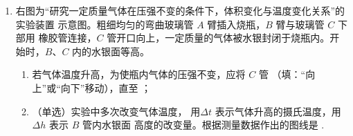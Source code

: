 \begin{enumerate}
\item 
{}
右图为“研究一定质量气体在压强不变的条件下，体积变化与温度变化关系”的实验装置
示意图。粗细均匀的弯曲玻璃管 $ A $ 臂插入烧瓶，$ B $ 臂与玻璃管 $ C $ 下部用
橡胶管连接，$ C $ 管开口向上，一定质量的气体被水银封闭于烧瓶内。开
始时，$ B $、$ C $ 内的水银面等高。
\begin{figure}[h!]
	\centering
	
\end{figure}


\begin{enumerate}
	\item
若气体温度升高，为使瓶内气体的压强不变，应将 $ C $ 管 \underlinegap 
（填：“向上”或“向下”移动），直至 \underlinegap ；

\item 
（单选）实验中多次改变气体温度， 用$ \Delta t $ 表示气体升高的摄氏温度，用$ \Delta h $ 表示 $ B $ 管内水银面
高度的改变量。根据测量数据作出的图线是 \underlinegap .
\pfourchoices
{}
{}
{}
{}



	
\end{enumerate}






\end{enumerate}
